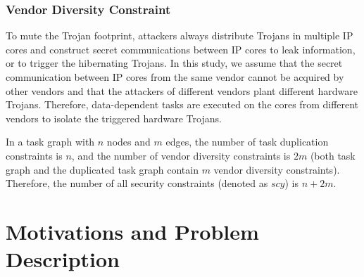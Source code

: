 \documentclass[10pt,journal]{IEEEtran}
\begin{document}
\subsubsection{\textbf{Vendor Diversity Constraint}}

To mute the Trojan footprint, attackers always distribute Trojans in multiple IP cores and construct secret communications between IP cores to leak information, or to trigger the hibernating Trojans\cite{article:CL}. In this study, we assume that the secret communication between IP cores from the same vendor cannot be acquired by other vendors and that the attackers of different vendors plant different hardware Trojans. Therefore, data-dependent tasks are executed on the cores from different vendors to isolate the triggered hardware Trojans.



In a task graph with $n$ nodes and $m$ edges, the number of task duplication constraints is $n$, and the number of vendor diversity constraints is $2m$ (both task graph and the duplicated task graph contain $m$ vendor diversity constraints). Therefore, the number of all security constraints (denoted as $scy$) is $n+2m$.



\section{Motivations and Problem Description}
\end{document}
